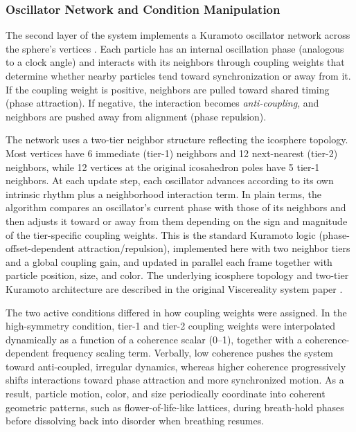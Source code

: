 \documentclass[pdflatex,sn-basic,lineno]{sn-jnl}
\begin{document}
\subsubsection{Oscillator Network and Condition Manipulation}\label{subsubsec:oscillator_network}
The second layer of the system implements a Kuramoto oscillator network across the sphere's vertices \citep{acebron2005,Rodrigues2016}. Each particle has an internal oscillation phase (analogous to a clock angle) and interacts with its neighbors through coupling weights that determine whether nearby particles tend toward synchronization or away from it. If the coupling weight is positive, neighbors are pulled toward shared timing (phase attraction). If negative, the interaction becomes \emph{anti-coupling}, and neighbors are pushed away from alignment (phase repulsion).

The network uses a two-tier neighbor structure reflecting the icosphere topology. Most vertices have 6 immediate (tier-1) neighbors and 12 next-nearest (tier-2) neighbors, while 12 vertices at the original icosahedron poles have 5 tier-1 neighbors. At each update step, each oscillator advances according to its own intrinsic rhythm plus a neighborhood interaction term. In plain terms, the algorithm compares an oscillator's current phase with those of its neighbors and then adjusts it toward or away from them depending on the sign and magnitude of the tier-specific coupling weights. This is the standard Kuramoto logic (phase-offset-dependent attraction/repulsion), implemented here with two neighbor tiers and a global coupling gain, and updated in parallel each frame together with particle position, size, and color. The underlying icosphere topology and two-tier Kuramoto architecture are described in the original Viscereality system paper \citep{fejer2025viscereality}.

The two active conditions differed in how coupling weights were assigned. In the high-symmetry condition, tier-1 and tier-2 coupling weights were interpolated dynamically as a function of a coherence scalar (0--1), together with a coherence-dependent frequency scaling term. Verbally, low coherence pushes the system toward anti-coupled, irregular dynamics, whereas higher coherence progressively shifts interactions toward phase attraction and more synchronized motion. As a result, particle motion, color, and size periodically coordinate into coherent geometric patterns, such as flower-of-life-like lattices, during breath-hold phases before dissolving back into disorder when breathing resumes.
\end{document}
